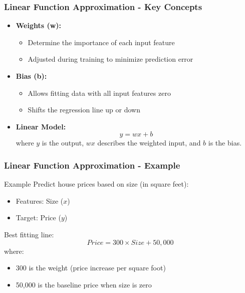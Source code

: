 \documentclass[aspectratio=169]{beamer}
\begin{document}
\begin{frame}[fragile]
    \frametitle{Linear Function Approximation - Key Concepts}
    \begin{itemize}
        \item \textbf{Weights (w):}
        \begin{itemize}
            \item Determine the importance of each input feature
            \item Adjusted during training to minimize prediction error
        \end{itemize}

        \item \textbf{Bias (b):}
        \begin{itemize}
            \item Allows fitting data with all input features zero
            \item Shifts the regression line up or down
        \end{itemize}

        \item \textbf{Linear Model:}
        \begin{equation}
            y = wx + b 
        \end{equation}
        where \(y\) is the output, \(wx\) describes the weighted input, and \(b\) is the bias.
    \end{itemize}
\end{frame}

\begin{frame}[fragile]
    \frametitle{Linear Function Approximation - Example}
    \begin{block}{Example}
        Predict house prices based on size (in square feet):
        \begin{itemize}
            \item Features: Size (\(x\))
            \item Target: Price (\(y\))
        \end{itemize}
        Best fitting line:
        \begin{equation}
            Price = 300 \times Size + 50,000 
        \end{equation}
        where:
        \begin{itemize}
            \item 300 is the weight (price increase per square foot)
            \item 50,000 is the baseline price when size is zero
        \end{itemize}
    \end{block}
\end{frame}
\end{document}
